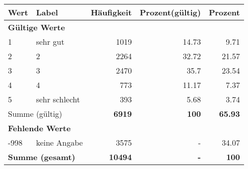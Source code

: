      \begin{longtable}{lXrrr}
     \toprule
     \textbf{Wert} & \textbf{Label} & \textbf{Häufigkeit} & \textbf{Prozent(gültig)} & \textbf{Prozent} \\
     \endhead
     \midrule
     \multicolumn{5}{l}{\textbf{Gültige Werte}}\\

     1 &
     \multicolumn{1}{X}{ sehr gut   } &


       \num{1019} &
       \num[round-mode=places,round-precision=2]{14.73} &
         \num[round-mode=places,round-precision=2]{9.71} \\

     2 &
     \multicolumn{1}{X}{ 2   } &


       \num{2264} &
       \num[round-mode=places,round-precision=2]{32.72} &
         \num[round-mode=places,round-precision=2]{21.57} \\

     3 &
     \multicolumn{1}{X}{ 3   } &


       \num{2470} &
       \num[round-mode=places,round-precision=2]{35.7} &
         \num[round-mode=places,round-precision=2]{23.54} \\

     4 &
     \multicolumn{1}{X}{ 4   } &


       \num{773} &
       \num[round-mode=places,round-precision=2]{11.17} &
         \num[round-mode=places,round-precision=2]{7.37} \\

     5 &
     \multicolumn{1}{X}{ sehr schlecht   } &


       \num{393} &
       \num[round-mode=places,round-precision=2]{5.68} &
         \num[round-mode=places,round-precision=2]{3.74} \\
     \midrule
     \multicolumn{2}{l}{Summe (gültig)} &
       \textbf{\num{6919}} &
     \textbf{\num{100}} &
       \textbf{\num[round-mode=places,round-precision=2]{65.93}} \\
     \multicolumn{5}{l}{\textbf{Fehlende Werte}}\\
       -998 &
       keine Angabe &
         \num{3575} &
        - &
         \num[round-mode=places,round-precision=2]{34.07} \\
     \midrule
     \multicolumn{2}{l}{\textbf{Summe (gesamt)}} &
          \textbf{\num{10494}} &
        \textbf{-} &
        \textbf{\num{100}} \\
     \bottomrule
     \end{longtable}
     
